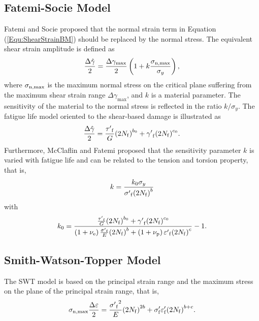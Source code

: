 \subsection{Fatemi-Socie Model}
\noindent
Fatemi and Socie \cite{Fatemi1988} proposed that the normal strain term in Equation (\ref{Equ:ShearStrainBM}) should be replaced by the normal stress.
The equivalent shear strain amplitude is defined as
\begin{equation}
\frac{{\Delta \hat \gamma }}{2} = \frac{{\Delta {\gamma _{\max }}}}{2}\left( {1 + k\frac{{{\sigma _{\rm n,\max}}}}{{{\sigma _y}}}} \right),
\end{equation}
where
$\sigma _{\rm n,\max}$ is the maximum normal stress on the critical plane suffering from the maximum shear strain range $\Delta {\gamma _{\max}}$, and $k$ is a material parameter. The sensitivity of the material to the normal stress is reflected in the ratio $k/\sigma_y$.
The fatigue life model oriented to the shear-based damage is illustrated as
\begin{equation}
\frac{{\Delta \hat \gamma }}{2} = \frac{{{{\tau '}_{\rm f}}}}{G}{\left( {2{N_{\rm f}}} \right)^{{b_0}}} + {{\gamma '}_{\rm f}}{\left( {2{N_{\rm f}}} \right)^{{c_0}}}.
\label{Equ:FS_model}
\end{equation}
Furthermore, McClaflin and Fatemi \cite{McClaflin2004} proposed that the sensitivity parameter $k$ is varied with fatigue life and can be related to the tension and torsion property, that is,
\begin{equation}
k =  \frac{{k_0 {\sigma _y}}}{{{{\sigma '}_{\rm f}}{{\left( {2{N_{\rm f}}} \right)}^b}}}
\label{Equ:k_in_FS_model}
\end{equation}
with
\[
k_0 =  {\frac{{\frac{{{{\tau '}_{\rm f}}}}{G}{{\left( {2{N_{\rm f}}} \right)}^{{b_0}}} + {{\gamma '}_{\rm f}}{{\left( {2{N_{\rm f}}} \right)}^{{c_0}}}}}{{\left( {1 + {\nu _{\rm e}}} \right)\frac{{{{\sigma '}_{\rm f}}}}{E}{{\left( {2{N_{\rm f}}} \right)}^b} + \left( {1 + {\nu _{\rm p}}} \right){{\varepsilon '}_{\rm f}}{{\left( {2{N_{\rm f}}} \right)}^c}}} - 1} .
\]


\subsection{Smith-Watson-Topper Model}
\noindent
The SWT model \cite{Socie2000} is based on the principal strain range and the maximum stress on the plane of the principal
strain range, that is,
\begin{equation}
{\sigma _{\rm n, \max}}\frac{{\Delta \varepsilon }}{2} = \frac{{{{\sigma '}_{\rm f}}^2}}{E}{\left( {2{N_{\rm f}}} \right)^{2b}} + {\sigma '_{\rm f}}{\varepsilon '_{\rm f}}{\left( {2{N_{\rm f}}} \right)^{b + c}}.
\label{Equ:SWT_model}
\end{equation}

